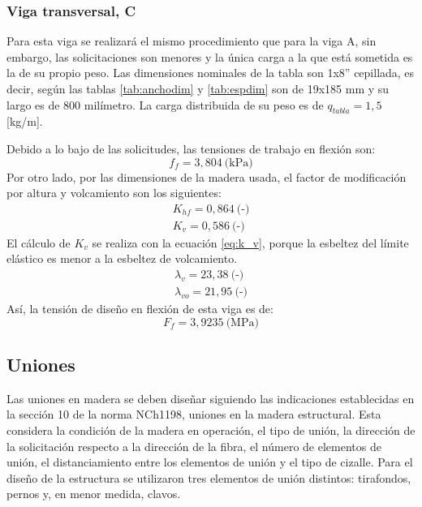 \subsubsection{Viga transversal, C}
Para esta viga se realizará el mismo procedimiento que para la viga A, sin embargo, las solicitaciones son menores y la única carga a la que está sometida es la de su propio peso. Las dimensiones nominales de la tabla son 1x8'' cepillada, es decir, según las tablas \ref{tab:anchodim} y \ref{tab:espdim} son de 19x185 mm y su largo es de 800 milímetro. La carga distribuida de su peso es de $q_{tabla}=1,5$ [kg/m].

Debido a lo bajo de las solicitudes, las tensiones de trabajo en flexión son:
\begin{equation}
	f_f = 3,804 \: \text{(kPa)} 
\end{equation}
Por otro lado, por las dimensiones de la madera usada, el factor de modificación por altura y volcamiento son los siguientes:
\begin{gather*}
	K_{hf} = 0,864\: \text{(-)}\\
	K_{v} = 0,586\: \text{(-)}
\end{gather*}
El cálculo de $K_v$ se realiza con la ecuación \ref{eq:k_v}, porque la esbeltez del límite elástico es menor a la esbeltez de volcamiento.
\begin{gather*}
	\lambda_v = 23,38 \: \text{(-)}\\
	\lambda_{vo} = 21,95 \: \text{(-)}
\end{gather*}
Así, la tensión de diseño en flexión de esta viga es de:
\begin{equation}
	F_f = 3,9235 \: \text{(MPa)}
\end{equation}

\subsection{Uniones}
Las uniones en madera se deben diseñar siguiendo las indicaciones establecidas en la sección 10 de la norma NCh1198, uniones en la madera estructural. Esta considera la condición de la madera en operación, el tipo de unión, la dirección de la solicitación respecto a la dirección de la fibra, el número de elementos de unión, el distanciamiento entre los elementos de unión y el tipo de cizalle. Para el diseño de la estructura se utilizaron tres elementos de unión distintos: tirafondos, pernos y, en menor medida, clavos.

